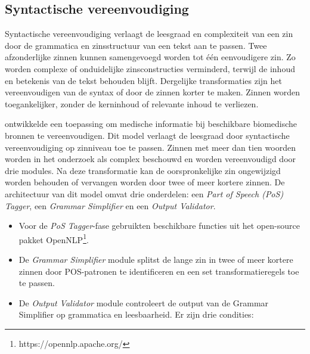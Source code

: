 

\subsection{Syntactische vereenvoudiging}

Syntactische vereenvoudiging verlaagt de leesgraad en complexiteit van een zin door de grammatica en zinsstructuur van een tekst aan te passen. Twee afzonderlijke zinnen kunnen samengevoegd worden tot één eenvoudigere zin. Zo worden complexe of onduidelijke zinsconstructies verminderd, terwijl de inhoud en betekenis van de tekst behouden blijft. Dergelijke transformaties zijn het vereenvoudigen van de syntax of door de zinnen korter te maken. Zinnen worden toegankelijker, zonder de kerninhoud of relevante inhoud te verliezen.

\textcite{Kandula2010} ontwikkelde een toepassing om medische informatie bij beschikbare biomedische bronnen te vereenvoudigen. Dit model verlaagt de leesgraad door syntactische vereenvoudiging op zinniveau toe te passen. Zinnen met meer dan tien woorden worden in het onderzoek als complex beschouwd en worden vereenvoudigd door drie modules. Na deze transformatie kan de oorspronkelijke zin ongewijzigd worden behouden of vervangen worden door twee of meer kortere zinnen. De architectuur van dit model omvat drie onderdelen: een \textit{Part of Speech (PoS) Tagger}, een \textit{Grammar Simplifier} en een \textit{Output Validator}. 

\begin{itemize}
	\item Voor de \textit{PoS Tagger}-fase gebruikten \textcite{Kandula2010} beschikbare functies uit het open-source pakket OpenNLP\footnote{https://opennlp.apache.org/}.
	\item De \textit{Grammar Simplifier} module splitst de lange zin in twee of meer kortere zinnen door POS-patronen te identificeren en een set transformatieregels toe te passen.
	\item De \textit{Output Validator} module controleert de output van de Grammar Simplifier op grammatica en leesbaarheid. Er zijn drie condities:
\end{itemize}  


